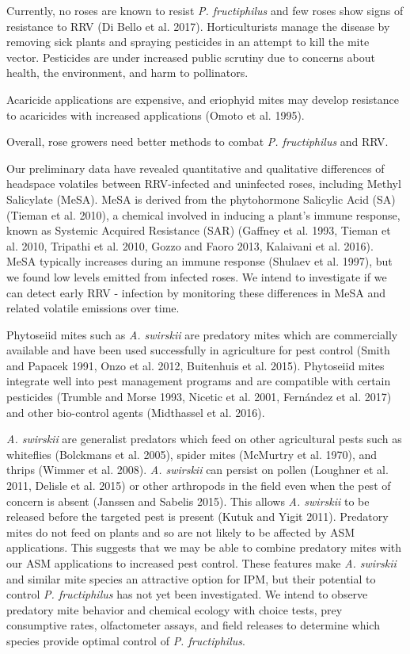 \documentclass[12pt,final,CPage]{ufthesis}
\begin{document}
{  Currently, no roses are known to resist \emph{P. fructiphilus} and few roses show signs of resistance to RRV (Di Bello et al. 2017). Horticulturists manage the disease by removing sick plants and spraying pesticides in an attempt to kill the mite vector. Pesticides are under increased public scrutiny due to concerns about health, the environment, and harm to pollinators.

  Acaricide applications are expensive, and eriophyid mites may develop resistance to acaricides with increased applications (Omoto et al. 1995).

  Overall, rose growers need better methods to combat \emph{P. fructiphilus} and RRV.

  Our preliminary data have revealed quantitative and qualitative differences of headspace volatiles between RRV-infected and uninfected roses, including Methyl Salicylate (MeSA). MeSA is derived from the phytohormone Salicylic Acid (SA) (Tieman et al. 2010), a chemical involved in inducing a plant's immune response, known as Systemic Acquired Resistance (SAR) (Gaffney et al. 1993, Tieman et al. 2010, Tripathi et al. 2010, Gozzo and Faoro 2013, Kalaivani et al. 2016). MeSA typically increases during an immune response (Shulaev et al. 1997), but we found low levels emitted from infected roses. We intend to investigate if we can detect early RRV - infection by monitoring these differences in MeSA and related volatile emissions over time.

  Phytoseiid mites such as \emph{A. swirskii} are predatory mites which are commercially available and have been used successfully in agriculture for pest control (Smith and Papacek 1991, Onzo et al. 2012, Buitenhuis et al. 2015). Phytoseiid mites integrate well into pest management programs and are compatible with certain pesticides (Trumble and Morse 1993, Nicetic et al. 2001, Fernández et al. 2017) and other bio-control agents (Midthassel et al. 2016).

  \emph{A. swirskii} are generalist predators which feed on other agricultural pests such as whiteflies (Bolckmans et al. 2005), spider mites (McMurtry et al. 1970), and thrips (Wimmer et al. 2008). \emph{A. swirskii} can persist on pollen (Loughner et al. 2011, Delisle et al. 2015) or other arthropods in the field even when the pest of concern is absent (Janssen and Sabelis 2015). This allows \emph{A. swirskii} to be released before the targeted pest is present (Kutuk and Yigit 2011). Predatory mites do not feed on plants and so are not likely to be affected by ASM applications. This suggests that we may be able to combine predatory mites with our ASM applications to increased pest control. These features make \emph{A. swirskii} and similar mite species an attractive option for IPM, but their potential to control \emph{P. fructiphilus} has not yet been investigated. We intend to observe predatory mite behavior and chemical ecology with choice tests, prey consumptive rates, olfactometer assays, and field releases to determine which species provide optimal control of \emph{P. fructiphilus}.

}
\end{document}
